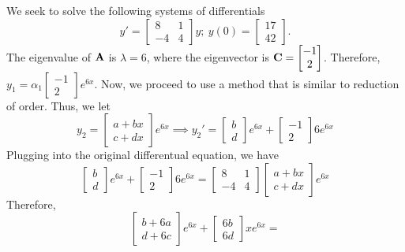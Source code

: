 \newpage
\begin{example}
    We seek to solve the following systems of differentials 
    $$y' = \begin{bmatrix} 8 & 1 \\ -4 & 4\end{bmatrix}y;~y(0) =  
    \begin{bmatrix} 17 \\ 42 \end{bmatrix}.$$
    The eigenvalue of $\bold{A}$ is $\lambda = 6$, where the eigenvector
    is $\bold{C} = \begin{bmatrix} -1 \\ 2 \end{bmatrix}$. Therefore,
    $y_1 = \alpha_1\begin{bmatrix} -1 \\ 2 \end{bmatrix}e^{6x}.$ Now,
    we proceed to use a method that is similar to reduction of order. Thus,
    we let 
    $$y_2 = \begin{bmatrix} a+bx \\ c+dx \end{bmatrix} e^{6x} \implies
    y_2' = \begin{bmatrix} b \\ d \end{bmatrix} e^{6x}+
    \begin{bmatrix} -1 \\ 2 \end{bmatrix}6e^{6x}$$
    Plugging into the original differentual equation, we have
    $$\begin{bmatrix} b \\ d \end{bmatrix} e^{6x}+
    \begin{bmatrix} -1 \\ 2 \end{bmatrix}6e^{6x} = 
    \begin{bmatrix} 8 & 1 \\ -4 & 4\end{bmatrix}\begin{bmatrix} a+bx \\ c+dx \end{bmatrix} e^{6x}$$
    Therefore,
    $$\begin{bmatrix} b+6a \\ d+6c \end{bmatrix}e^{6x}+\begin{bmatrix} 6b \\ 6d \end{bmatrix}xe^{6x} = 
$$
\end{example}
